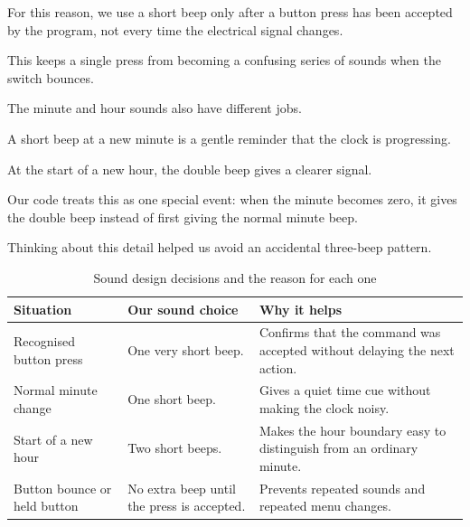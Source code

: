 \documentclass[12pt,letterpaper]{article}
\begin{document}
For this reason,
we use a short beep only after
a button press has been accepted by the program,
not every time the electrical signal changes.

This keeps a single press
from becoming a confusing series of sounds
when the switch bounces.

The minute and hour sounds
also have different jobs.

A short beep at a new minute
is a gentle reminder
that the clock is progressing.

At the start of a new hour,
the double beep gives a clearer signal.

Our code treats this as one special event:
when the minute becomes zero,
it gives the double beep
instead of first giving the normal minute beep.

Thinking about this detail helped us avoid
an accidental three-beep pattern.

\begin{table}[H]

  \centering

  \caption{
  Sound design decisions and the reason for each one
  }

  \label{tab:sound-decisions}

  \begin{tabularx}{
    \textwidth
  }{
    @{}p{36mm}Y Y@{}
  }

    \toprule

    \textbf{Situation}
    &
    \textbf{Our sound choice}
    &
    \textbf{Why it helps}
    \\

    \midrule

    Recognised button press
    &
    One very short beep.
    &
    Confirms that the command was accepted
    without delaying the next action.
    \\

    Normal minute change
    &
    One short beep.
    &
    Gives a quiet time cue
    without making the clock noisy.
    \\

    Start of a new hour
    &
    Two short beeps.
    &
    Makes the hour boundary easy to distinguish
    from an ordinary minute.
    \\

    Button bounce or held button
    &
    No extra beep until the press is accepted.
    &
    Prevents repeated sounds
    and repeated menu changes.
    \\

    \bottomrule

  \end{tabularx}

\end{table}
\end{document}
